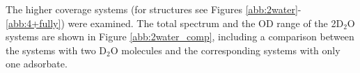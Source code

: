 \documentclass[11pt,DIV=13,BCOR=5mm,a4paper,headinclude]{scrbook}
\begin{document}
The higher coverage systems (for structures see Figures \ref{abb:2water}-\ref{abb:4+fully}) were examined.
The total spectrum and the OD range of the 2D$_2$O systems are shown in Figure %
\ref{abb:2water_comp}, including a comparison between the systems with two D$_2$O molecules and the corresponding systems with only one adsorbate.
\end{document}
